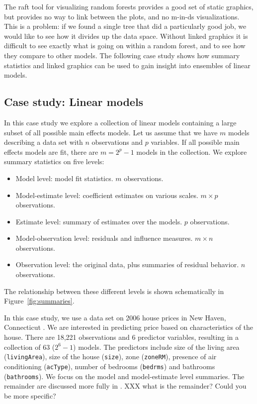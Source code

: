 \documentclass[preprint]{imsart}
\newcommand{\hh}[1]{{\color{ForestGreen} #1}}
\begin{document}
The {\sc raft} tool \citep{raft} for visualizing random forests provides a good set of static graphics, but provides no way to link between the plots, and no m-in-ds visualizations. This is a problem: if we found a single tree that did a particularly good job, we would like to see how it divides up the data space. Without linked graphics it is difficult to see exactly what is going on within a random forest, and to see how they compare to other models.  The following case study shows how summary statistics and linked graphics can be used to gain insight into ensembles of linear models.

\subsection{Case study: Linear models}
\label{sec:linear-models}

In this case study we  explore a collection of linear models containing a large subset of all possible main effects models. Let us assume that we have $m$ models describing a data set with $n$ observations and $p$ variables. If all possible main effects models are fit, there are $m = 2^p - 1$ models in the collection. We  explore summary statistics on five levels:

\begin{itemize} \itemsep 0in
  \item Model level: model fit statistics.  $m$ observations.
  \item Model-estimate level: coefficient estimates on various scales.  $m \times p$ observations.
  \item Estimate level: summary of estimates over the models.  $p$ observations.
  \item Model-observation level: residuals and influence measures.  $m \times n$ observations.
  \item Observation level: the original data, plus summaries of residual behavior. $n$ observations.
\end{itemize}

\noindent The relationship between these different levels is shown schematically in Figure~\ref{fig:summaries}.

In this case study, we  use a data set on 2006 house prices in New Haven, Connecticut \citep{emerson}. We are interested in predicting price based on characteristics of the house. There are 18,221 observations and 6 predictor variables, resulting in a collection of 63 ($2^6 - 1$) models. The predictors include size of the living area ({\tt livingArea}), size of the house ({\tt size}), zone ({\tt zoneRM}), presence of air conditioning ({\tt acType}), number of bedrooms ({\tt bedrms}) and bathrooms ({\tt bathrooms}). We  focus on the  model and model-estimate level summaries. The remainder are discussed more fully in \citet{wickham:2007h}.
\hh{XXX what is the remainder? Could you be more specific?}
\end{document}
